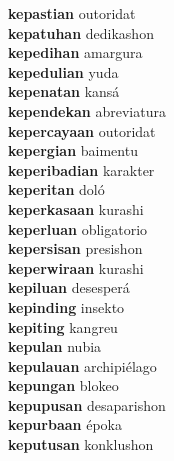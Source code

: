 \textbf{kepastian } outoridat \\
\textbf{kepatuhan } dedikashon \\
\textbf{kepedihan } amargura \\
\textbf{kepedulian } yuda \\
\textbf{kepenatan } kansá \\
\textbf{kependekan } abreviatura \\
\textbf{kepercayaan } outoridat \\
\textbf{kepergian } baimentu \\
\textbf{keperibadian } karakter \\
\textbf{keperitan } doló \\
\textbf{keperkasaan } kurashi \\
\textbf{keperluan } obligatorio \\
\textbf{kepersisan } presishon \\
\textbf{keperwiraan } kurashi \\
\textbf{kepiluan } desesperá \\
\textbf{kepinding } insekto \\
\textbf{kepiting } kangreu \\
\textbf{kepulan } nubia \\
\textbf{kepulauan } archipiélago \\
\textbf{kepungan } blokeo \\
\textbf{kepupusan } desaparishon \\
\textbf{kepurbaan } époka \\
\textbf{keputusan } konklushon \\
